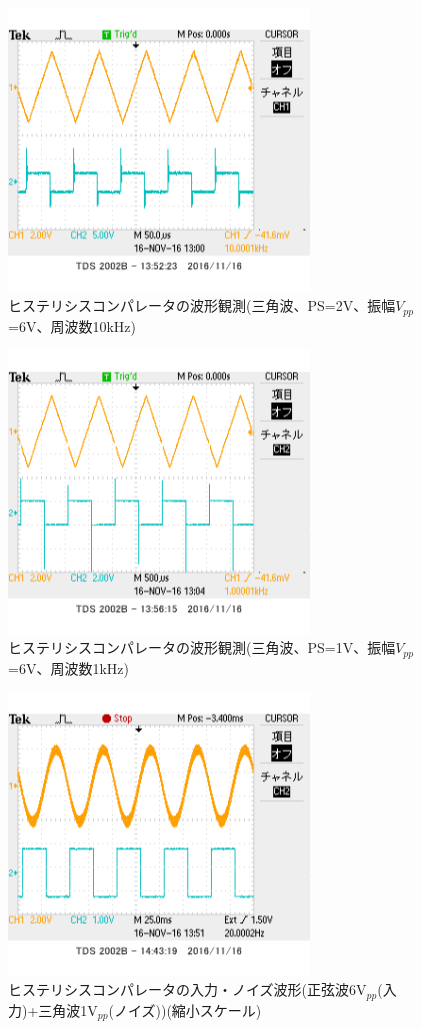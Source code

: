 \documentclass[11pt,a4j]{jsarticle}
\begin{document}
 \begin{figure}[htbp]
  \centering
  \includegraphics[width=8cm,clip]{1_2_histeri_Vth2f10V6sankaku_ViVo.png}
  \caption{ヒステリシスコンパレータの波形観測(三角波、PS=2V、振幅$V_{pp}$=6V、周波数10kHz)}
  \label{fig:histeri_2-10}
 \end{figure}
 
 \begin{figure}[htbp]
  \centering
  \includegraphics[width=8cm,clip]{1_2_histeri_Vth1f1V6sankaku_ViVo.png}
  \caption{ヒステリシスコンパレータの波形観測(三角波、PS=1V、振幅$V_{pp}$=6V、周波数1kHz)}
  \label{fig:histeri_1-1}
 \end{figure}
 
 \begin{figure}[htbp]
  \centering
  \includegraphics[width=8cm,clip]{1_2_noise_before_6-1_BigScale.png}
  \caption{ヒステリシスコンパレータの入力・ノイズ波形(正弦波6V$_{pp}$(入力)+三角波1V$_{pp}$(ノイズ))(縮小スケール)}
  \label{fig:noise_before_6-1_big}
 \end{figure}
 
\end{document}
